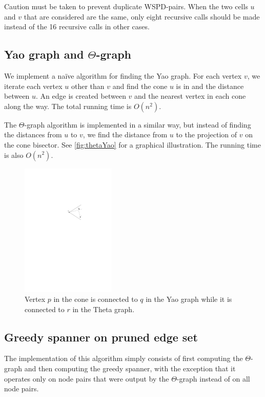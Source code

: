 \documentclass[a4paper,twoside,11pt,hidelinks]{article}
\theoremstyle{plain}
\theoremstyle{definition}  %
\begin{document}
Caution must be taken to prevent duplicate WSPD-pairs. When the two cells $u$ and $v$ that are considered are the same, only eight recursive calls should be made instead of the 16 recursive calls in other cases.


\subsection{Yao graph and \texorpdfstring{$\Theta$}{Theta}-graph}

We implement a na{\"i}ve algorithm for finding the Yao graph. For each vertex $v$, we iterate each vertex $u$ other than $v$ and find the cone $u$ is in and the distance between $u$. An edge is created between $v$ and the nearest vertex in each cone along the way. The total running time is $O(n^2)$.

The $\Theta$-graph algorithm is implemented in a similar way, but instead of finding the distances from $u$ to $v$, we find the distance from $u$ to the projection of $v$ on the cone bisector. See \autoref{fig:thetaYao} for a graphical illustration. The running time is also $O(n^{2})$.

\begin{figure}[h]
    \centering
    \includegraphics[width=0.4\textwidth]{figures/Theta.pdf}
    \caption{Vertex $p$ in the cone is connected to $q$ in the Yao graph while it is connected to $r$ in the Theta graph.}
    \label{fig:thetaYao}
\end{figure}

\subsection{Greedy spanner on pruned edge set}

The implementation of this algorithm simply consists of first computing the $\Theta$-graph and then computing the greedy spanner, with the exception that it operates only on node pairs that were output by the $\Theta$-graph instead of on all node pairs.
\end{document}
